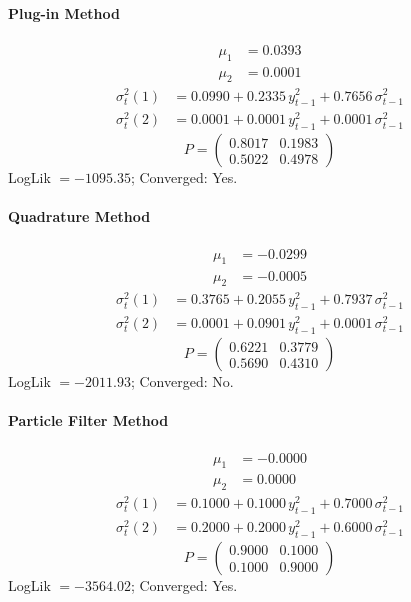 \documentclass[11pt, a4paper]{article}
\begin{document}
\paragraph{Plug-in Method}
\begin{align}
\mu_{1} &= 0.0393 \\
\mu_{2} &= 0.0001
\end{align}
\begin{align}
\sigma^2_{t}(1) &= 0.0990 + 0.2335\, y_{t-1}^2 + 0.7656\, \sigma^2_{t-1} \\
\sigma^2_{t}(2) &= 0.0001 + 0.0001\, y_{t-1}^2 + 0.0001\, \sigma^2_{t-1}
\end{align}
\begin{equation}
P = \begin{pmatrix} 0.8017 & 0.1983 \\ 0.5022 & 0.4978 \end{pmatrix}
\end{equation}
LogLik $= -1095.35$; Converged: Yes.

\paragraph{Quadrature Method}
\begin{align}
\mu_{1} &= -0.0299 \\
\mu_{2} &= -0.0005
\end{align}
\begin{align}
\sigma^2_{t}(1) &= 0.3765 + 0.2055\, y_{t-1}^2 + 0.7937\, \sigma^2_{t-1} \\
\sigma^2_{t}(2) &= 0.0001 + 0.0901\, y_{t-1}^2 + 0.0001\, \sigma^2_{t-1}
\end{align}
\begin{equation}
P = \begin{pmatrix} 0.6221 & 0.3779 \\ 0.5690 & 0.4310 \end{pmatrix}
\end{equation}
LogLik $= -2011.93$; Converged: No.

\paragraph{Particle Filter Method}
\begin{align}
\mu_{1} &= -0.0000 \\
\mu_{2} &= 0.0000
\end{align}
\begin{align}
\sigma^2_{t}(1) &= 0.1000 + 0.1000\, y_{t-1}^2 + 0.7000\, \sigma^2_{t-1} \\
\sigma^2_{t}(2) &= 0.2000 + 0.2000\, y_{t-1}^2 + 0.6000\, \sigma^2_{t-1}
\end{align}
\begin{equation}
P = \begin{pmatrix} 0.9000 & 0.1000 \\ 0.1000 & 0.9000 \end{pmatrix}
\end{equation}
LogLik $= -3564.02$; Converged: Yes.
\end{document}
